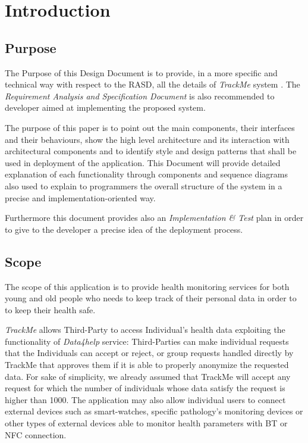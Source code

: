 \documentclass[a4paper]{article}
\begin{document}

\tableofcontents
{}

\newpage
\pagestyle{fancy}

\section{Introduction}
\subsection{Purpose}
    The Purpose of this Design Document is to provide, in a more specific and technical way with respect to the RASD, all the details of \textit{TrackMe} system \cite{rasd}. The \textit{Requirement Analysis and Specification Document} is also recommended to developer aimed at implementing the proposed system.
    
    The purpose of this paper is to point out the main components, their interfaces and their behaviours, show the high level architecture and its interaction with architectural components and to identify style and design patterns that shall be used in deployment of the application. This Document will provide detailed explanation of each functionality through components and sequence diagrams also used to explain to programmers the overall structure of the system in a precise and implementation-oriented way.
    
    Furthermore this document provides also an \textit{Implementation \& Test} plan in order to give to the developer a precise idea of the deployment process.
 
\subsection{Scope}
    The scope of this application is to provide health monitoring services for both young and old people who needs to keep track of their personal data in order to to keep their health safe.
    
    \textit{TrackMe} allows Third-Party to access Individual's health data exploiting the functionality of \textit{Data4help} service: Third-Parties can make individual requests that the Individuals can accept or reject, or group requests handled directly by TrackMe that approves them if it is able to properly anonymize the requested data. For sake of simplicity, we already assumed that TrackMe will accept any request for which the number of individuals whose data satisfy the request is higher than 1000. The application may also allow individual users to connect external devices such as smart-watches, specific pathology's monitoring devices or other types of external devices able to monitor health parameters with BT or NFC connection.
\end{document}
